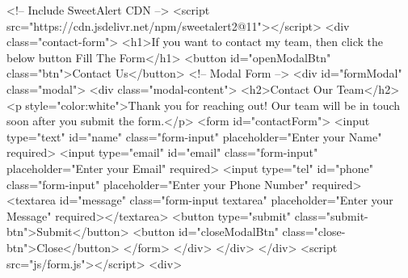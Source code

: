     <!-- Include SweetAlert CDN -->
    <script src="https://cdn.jsdelivr.net/npm/sweetalert2@11"></script>
    <div class="contact-form">
        <h1>If you want to contact my team, then click the below button Fill The Form</h1>
        <button id="openModalBtn" class="btn">Contact Us</button>
        <!-- Modal Form -->
        <div id="formModal" class="modal">
            <div class="modal-content">
                <h2>Contact Our Team</h2>
                <p style="color:white">Thank you for reaching out! Our team will be in touch soon after you submit the form.</p>
                <form id="contactForm">
                    <input type="text" id="name" class="form-input" placeholder="Enter your Name" required>
                    <input type="email" id="email" class="form-input" placeholder="Enter your Email" required>
                    <input type="tel" id="phone" class="form-input" placeholder="Enter your Phone Number" required>
                    <textarea id="message" class="form-input textarea" placeholder="Enter your Message" required></textarea>
                    <button type="submit" class="submit-btn">Submit</button>
                    <button id="closeModalBtn" class="close-btn">Close</button>
                </form>
            </div>
        </div>
    </div>
    <script src="js/form.js"></script>
    <div>


